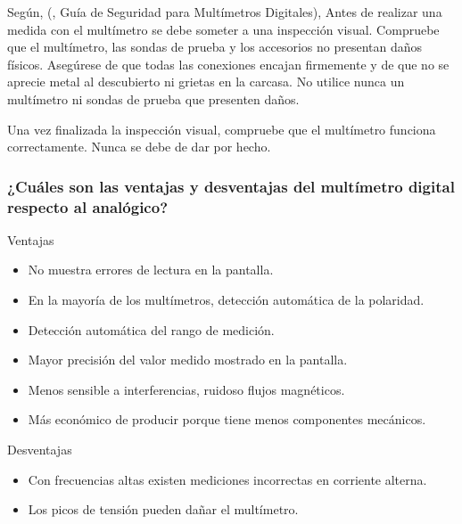 \documentclass[letterpaper, 12pt]{report}
\begin{document}
Según, (\cite{flukeCorporation}, Guía de Seguridad para Multímetros Digitales),
Antes de realizar una medida con el multímetro se debe someter a una inspección
visual. Compruebe que el multímetro, las sondas de prueba y los accesorios no
presentan daños físicos. Asegúrese de que todas las conexiones encajan
firmemente y de que no se aprecie metal al descubierto ni grietas en la carcasa.
No utilice nunca un multímetro ni sondas de prueba que presenten daños.

\vspace{.5cm}

Una vez finalizada la inspección visual, compruebe que el multímetro
funciona correctamente. Nunca se debe de dar por hecho.

\subsubsection{¿Cuáles son las ventajas y desventajas del multímetro digital
	respecto al analógico?}

\begin{center}
	Ventajas
\end{center}

\begin{itemize}
	\item No muestra errores de lectura en la pantalla.
	\item En la mayoría de los multímetros, detección automática de
	      la polaridad.
	\item Detección automática del rango de medición.
	\item Mayor precisión del valor medido mostrado en la pantalla.
	\item Menos sensible a interferencias, ruidoso flujos magnéticos.
	\item Más económico de producir porque tiene menos componentes mecánicos.
\end{itemize}

\vspace{.5cm}

\begin{center}
	Desventajas
\end{center}

\begin{itemize}
	\item Con frecuencias altas existen mediciones incorrectas en corriente
	      alterna.
	\item Los picos de tensión pueden dañar el multímetro.
\end{itemize}
\end{document}
